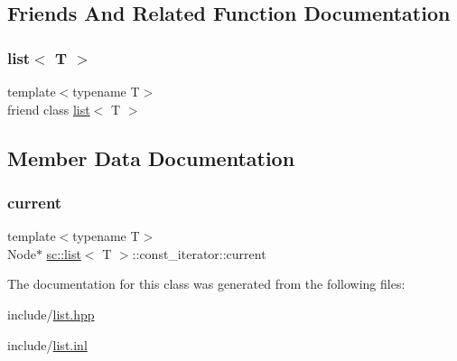 \subsection{Friends And Related Function Documentation}
\mbox{\label{classsc_1_1list_1_1const__iterator_ab6cf03d50c50087700b0fb872accfa7b}} 
\subsubsection{\texorpdfstring{list$<$ T $>$}{list< T >}}
{\footnotesize\ttfamily template$<$typename T$>$ \\
friend class \mbox{\hyperlink{classsc_1_1list}{list}}$<$ T $>$\hspace{0.3cm}{\ttfamily [friend]}}



\subsection{Member Data Documentation}
\mbox{\label{classsc_1_1list_1_1const__iterator_ac8a1ecff3dcc804cd3fabfaf2360d461}} 
\subsubsection{\texorpdfstring{current}{current}}
{\footnotesize\ttfamily template$<$typename T$>$ \\
Node$\ast$ \mbox{\hyperlink{classsc_1_1list}{sc\+::list}}$<$ T $>$\+::const\+\_\+iterator\+::current\hspace{0.3cm}{\ttfamily [protected]}}



The documentation for this class was generated from the following files\+:\begin{DoxyCompactItemize}
\item 
include/\mbox{\hyperlink{list_8hpp}{list.\+hpp}}\item 
include/\mbox{\hyperlink{list_8inl}{list.\+inl}}\end{DoxyCompactItemize}
